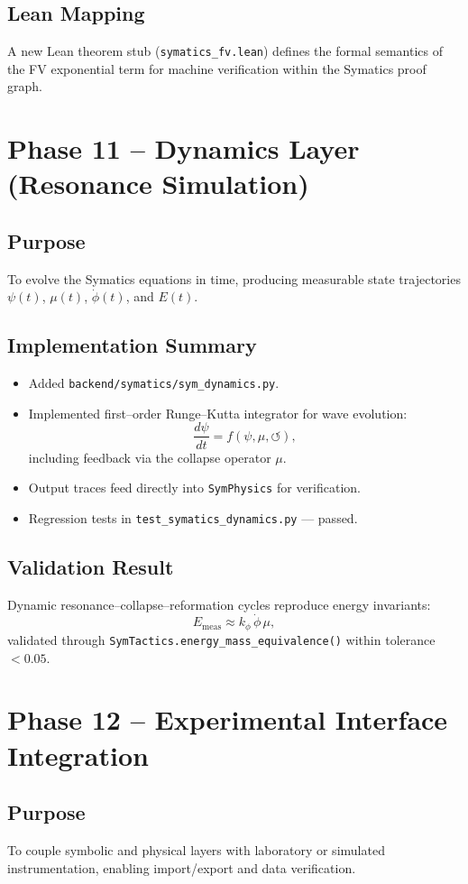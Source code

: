 \documentclass[12pt]{article}
\begin{document}
\subsection*{Lean Mapping}
A new Lean theorem stub (\texttt{symatics\_fv.lean}) defines the formal semantics of the FV exponential term for machine verification within the Symatics proof graph.

\section{Phase 11 -- Dynamics Layer (Resonance Simulation)}
\subsection*{Purpose}
To evolve the Symatics equations in time, producing measurable state trajectories $\psi(t)$, $\mu(t)$, $\dot{\phi}(t)$, and $E(t)$.

\subsection*{Implementation Summary}
\begin{itemize}[noitemsep]
  \item Added \texttt{backend/symatics/sym\_dynamics.py}.
  \item Implemented first--order Runge--Kutta integrator for wave evolution:
  \[
  \frac{d\psi}{dt} = f(\psi, \mu, \circlearrowleft),
  \]
  including feedback via the collapse operator $\mu$.
  \item Output traces feed directly into \texttt{SymPhysics} for verification.
  \item Regression tests in \texttt{test\_symatics\_dynamics.py} --- passed.
\end{itemize}

\subsection*{Validation Result}
Dynamic resonance--collapse--reformation cycles reproduce energy invariants:
\[
E_{\text{meas}} \approx k_\phi \, \dot{\phi} \, \mu,
\]
validated through \texttt{SymTactics.energy\_mass\_equivalence()} within tolerance $<0.05$.

\section{Phase 12 -- Experimental Interface Integration}
\subsection*{Purpose}
To couple symbolic and physical layers with laboratory or simulated instrumentation, enabling import/export and data verification.
\end{document}
